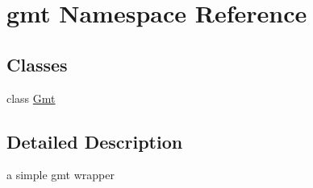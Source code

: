 \hypertarget{namespacegmt}{}\section{gmt Namespace Reference}
\label{namespacegmt}
\subsection*{Classes}
\begin{DoxyCompactItemize}
\item 
class \hyperlink{classgmt_1_1Gmt}{Gmt}
\end{DoxyCompactItemize}


\subsection{Detailed Description}
\begin{DoxyVerb}a simple gmt wrapper
\end{DoxyVerb}
 